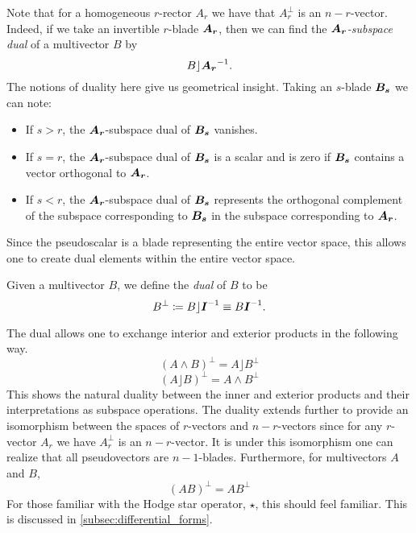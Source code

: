 Note that for a homogeneous $r$-rector $A_r$ we have that $A_r^\perp$ is an $n-r$-vector. Indeed, if we take an invertible $r$-blade $\boldsymbol{A_r}$, then we can find the \emph{$\boldsymbol{A_r}$-subspace dual} of a multivector $B$ by
\[
B \rfloor \boldsymbol{A_r}^{-1}.
\]
The notions of duality here give us geometrical insight. Taking an $s$-blade $\boldsymbol{B_s}$ we can note:
\begin{itemize}
    \item If $s>r$, the $\boldsymbol{A_r}$-subspace dual of $\boldsymbol{B_s}$ vanishes.
    \item If $s=r$, the $\boldsymbol{A_r}$-subspace dual of $\boldsymbol{B_s}$ is a scalar and is zero if $\boldsymbol{B_s}$ contains a vector orthogonal to $\boldsymbol{A_r}$.
    \item If $s<r$, the $\boldsymbol{A_r}$-subspace dual of $\boldsymbol{B_s}$ represents the orthogonal complement of the subspace corresponding to $\boldsymbol{B_s}$ in the subspace corresponding to $\boldsymbol{A_r}$.
\end{itemize}  
Since the pseudoscalar is a blade representing the entire vector space, this allows one to create dual elements within the entire vector space. 
\begin{definition}
Given a multivector $B$, we define the \emph{dual} of $B$ to be
\begin{equation}
B^\perp \coloneqq B \rfloor \boldsymbol{I}^{-1} \equiv B\boldsymbol{I}^{-1}.
\end{equation}
\end{definition}
The dual allows one to exchange interior and exterior products in the following way.
\begin{equation}
\label{eq:wedge_to_dot}
 (A \wedge B)^\perp  = A\rfloor B^\perp
\end{equation}
\begin{equation}
\label{eq:dot_to_wedge}
    (A\rfloor B)^\perp = A \wedge B^\perp
\end{equation}
This shows the natural duality between the inner and exterior products and their interpretations as subspace operations. The duality extends further to provide an isomorphism between the spaces of $r$-vectors and $n-r$-vectors since for any $r$-vector $A_r$ we have $A_r^\perp$ is an $n-r$-vector. It is under this isomorphism one can realize that all pseudovectors are $n-1$-blades. Furthermore, for multivectors $A$ and $B$,
\begin{equation}
(AB)^\perp = AB^\perp
\end{equation}
For those familiar with the Hodge star operator, $\star$, this should feel familiar. This is discussed in \cref{subsec:differential_forms}.

